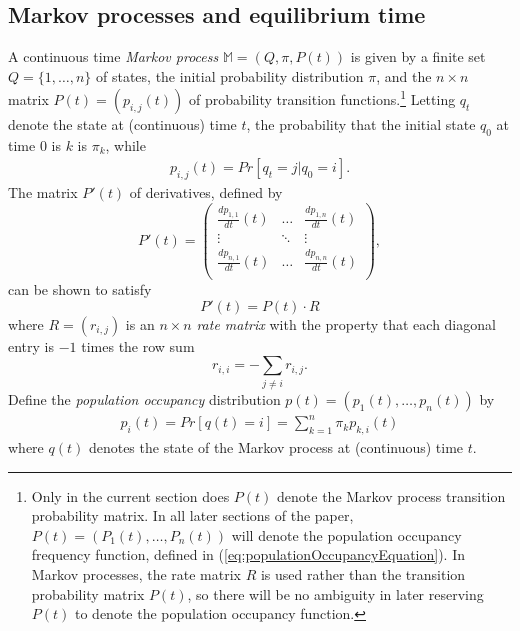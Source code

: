 \subsection{Markov processes and equilibrium time}



A continuous time {\em Markov process} $\mathbb{M}=(Q,\pi,P(t))$
is given by a finite set $Q= \{1,\ldots,n\}$ of states, the
initial probability distribution $\pi$,
and the $n\times n$ matrix $P(t)=(p_{i,j}(t))$ of
probability transition functions.\footnote{Only in the
current section does $P(t)$ denote the Markov process
transition probability matrix.  In all later sections of the paper,
$P(t) = (P_1(t),\ldots,P_n(t))$ will denote the population occupancy
frequency function, defined in (\ref{eq:populationOccupancyEquation}).
In Markov processes, the rate matrix $R$ is used rather than the transition
probability matrix $P(t)$, so there will be no ambiguity in later
reserving $P(t)$ to denote the population occupancy function.}
Letting $q_t$ denote the state at (continuous)
time $t$, the probability that the initial state $q_0$ at time $0$ is
$k$ is $\pi_k$, while
\begin{eqnarray}
\label{eq:MarkovProcess}
p_{i,j}(t) = Pr[q_{t} = j| q_0 = i] .
\end{eqnarray}
The matrix $P'(t)$ of derivatives, defined by
\begin{displaymath}
  P'(t) = \left(
\begin{array}{ccc}
\frac{d p_{1,1}}{d t}(t) & \ldots  & \frac{d p_{1,n}}{d t}(t)\\
\vdots & \ddots & \vdots\\
 \frac{d p_{n,1}}{d t}(t) & \ldots  & \frac{d p_{n,n}}{d t}(t)\\
\end{array}
\right),
\end{displaymath}
can be shown to satisfy
\begin{displaymath}
P'(t) = P(t) \cdot R
\end{displaymath}
where $R = (r_{i,j})$ is an $n \times n$ {\em rate matrix} with the
property that each diagonal entry is $-1$ times the row sum
\begin{displaymath}
r_{i,i} = - \sum_{j\ne i} r_{i,j}.
\end{displaymath}
Define the {\em population occupancy} distribution
$p(t) = (p_1(t),\ldots,p_n(t))$ by
\begin{eqnarray}
\label{eq:markovProcessPopulationFreq}
p_i(t) = Pr[q(t) = i] = \sum_{k=1}^n\pi_k p_{k,i}(t)
\end{eqnarray}
where $q(t)$ denotes the state of the Markov process
at (continuous) time $t$.

